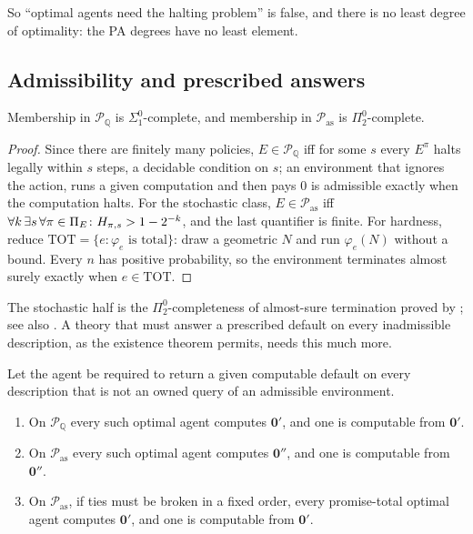 So \enquote{optimal agents need the halting problem} is false, and there is no least degree of
optimality: the PA degrees have no least element.

\subsection{Admissibility and prescribed answers}

\begin{proposition}\label{prop:admissibility}
Membership in $\mathcal P_{\mathbb Q}$ is $\Sigma^0_1$-complete, and membership in
$\mathcal P_{\mathrm{as}}$ is $\Pi^0_2$-complete.
\end{proposition}

\begin{proof}
Since there are finitely many policies, $E\in\mathcal P_{\mathbb Q}$ iff for some $s$ every $E^\pi$
halts legally within $s$ steps, a decidable condition on $s$; an environment that ignores the action,
runs a given computation and then pays $0$ is admissible exactly when the computation halts. For the
stochastic class, $E\in\mathcal P_{\mathrm{as}}$ iff $\forall k\,\exists s\,\forall\pi\in\Pi_E\colon
H_{\pi,s}>1-2^{-k}$, and the last quantifier is finite. For hardness, reduce
$\mathrm{TOT}=\{e:\varphi_e\text{ is total}\}$: draw a geometric $N$ and run $\varphi_e(N)$ without a
bound. Every $n$ has positive probability, so the environment terminates almost surely exactly when
$e\in\mathrm{TOT}$.
\end{proof}

The stochastic half is the $\Pi^0_2$-completeness of almost-sure termination proved by
\textcite{kaminskikatoen2015}; see also \textcite[§4]{kaminskietal2019}. A theory that must answer a prescribed default on every inadmissible
description, as the existence theorem permits, needs this much more.

\begin{proposition}\label{prop:defaults}
Let the agent be required to return a given computable default on every description that is not an
owned query of an admissible environment.
\begin{enumerate}[label=(\roman*)]
  \item On $\mathcal P_{\mathbb Q}$ every such optimal agent computes $\mathbf 0'$, and one is computable
        from $\mathbf 0'$.
  \item On $\mathcal P_{\mathrm{as}}$ every such optimal agent computes $\mathbf 0''$, and one is
        computable from $\mathbf 0''$.
  \item On $\mathcal P_{\mathrm{as}}$, if ties must be broken in a fixed order, every promise-total
        optimal agent computes $\mathbf 0'$, and one is computable from $\mathbf 0'$.
\end{enumerate}
\end{proposition}

